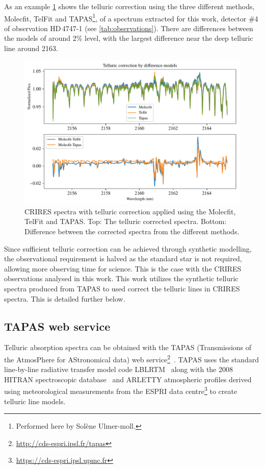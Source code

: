 As an example \cref{fig:telluricmodelcomparision} shows the telluric correction using the three different methods, {Molecfit}, {TelFit} and {TAPAS}\footnote{Performed here by Sol\`{e}ne Ulmer-moll.}, of a spectrum extracted for this work, detector \#4 of observation HD\,4747-1  (see \cref{tab:observations}).
There are differences between the models of around 2\% level, with the largest difference near the deep telluric line around 2163\nm{}.
\begin{figure}
    \centering
    \includegraphics[width=0.7\linewidth]{figures/atmos_and_models/Telluric_model_comparision}
    \caption[Telluric correction applied using the {Molecfit}, {TelFit} and {TAPAS}.]{CRIRES spectra with telluric correction applied using the {Molecfit}, {TelFit} and {TAPAS}.
        Top: The telluric corrected spectra.
        Bottom: Difference between the corrected spectra from the different methods.}
    \label{fig:telluricmodelcomparision}
\end{figure}

Since sufficient telluric correction can be achieved through synthetic modelling, the observational requirement is halved as the standard star is not required, allowing more observing time for science.
This is the case with the {CRIRES} observations analysed in this work.
This work utilizes the synthetic telluric spectra produced from {TAPAS} to used correct the telluric lines in {CRIRES} spectra.
This is detailed further below.

\subsection{{TAPAS} web service}
\label{subsubsec:TAPAS}

Telluric absorption spectra can be obtained with the {TAPAS} (Transmissions of the AtmosPhere for AStronomical data) web service\footnote{\href{http://cds-espri.ipsl.fr/tapas}{http://cds-espri.ipsl.fr/tapas}}~\citep{bertaux_tapas_2014}.
{TAPAS} uses the standard line-by-line radiative transfer model code LBLRTM~\citep{clough_linebyline_1995} along with the 2008 {HITRAN} spectroscopic database~\citep{rothman_hitran_2009} and {ARLETTY} atmospheric profiles derived using meteorological measurements from the ESPRI data centre\footnote{\href{https://cds-espri.ipsl.upmc.fr}{https://cds-espri.ipsl.upmc.fr}} to create telluric line models.

